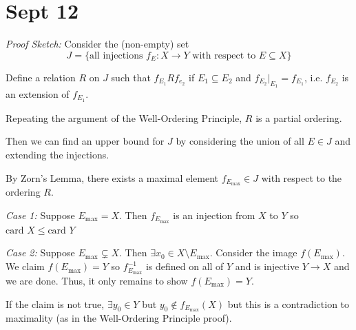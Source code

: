 \documentclass[12pt]{report}
\newcommand{\sub}{\subseteq}
\newcommand{\card}{\text{card }}
\newenvironment*{tbox}[2][gray]{
    \begin{tcolorbox}[
        parbox=false,
        colback=#1!5!white,
        colframe=#1!75!black,
        breakable,
        title={#2}
    ]}
    {\end{tcolorbox}}
\begin{document}
\section*{Sept 12}
    \begin{tbox}{\textbf{Property:} For any sets $x$ and $Y$, either $\card X \leq \card Y$ or $\card Y \leq \card X$}
        \emph{Proof Sketch:} Consider the (non-empty) set 
        \[J = \{\text{all injections } f_E: X \to Y \text{ with respect to } E \sub X\}\]
        
        Define a relation $R$ on $J$ such that $f_{E_1} R f_{e_2}$ if $E_1 \sub E_2$ and $f_{E_2}\big\vert_{E_1} = f_{E_1}$, i.e. $f_{E_2}$ is an extension of $f_{E_1}$.

        Repeating the argument of the Well-Ordering Principle, $R$ is a partial ordering. 

        Then we can find an upper bound for $J$ by considering the union of all $E \in J$ and extending the injections. 

        By Zorn's Lemma, there exists a maximal element $f_{E_{\max}} \in J$ with respect to the ordering $R$. 

        \emph{Case 1:} Suppose $E_{\max} = X$. Then $f_{E_{\max}}$ is an injection from $X$ to $Y$ so $\card X \leq \card Y$  

        \emph{Case 2:} Suppose $E_{\max} \subsetneq X$. Then $\exists x_0 \in X \setminus E_{\max}$. Consider the image $f(E_{\max})$. We claim $f(E_{\max}) = Y$ so $f_{E_{\max}}^{-1}$ is defined on all of $Y$ and is injective $Y \to X$ and we are done. Thus, it only remains to show $f(E_{\max}) = Y$. 

        If the claim is not true, $\exists y_0 \in Y$ but $y_0 \notin f_{E_{\max}}(X)$ but this is a contradiction to maximality (as in the Well-Ordering Principle proof).       
    \end{tbox}
\end{document}
